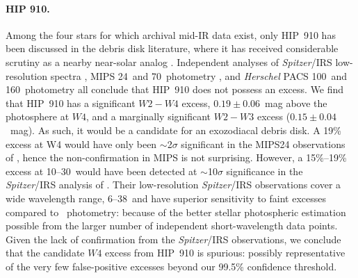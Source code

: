 \paragraph{HIP 910.}
Among the four stars for which archival mid-IR data exist, only HIP~910 has been discussed in the debris disk literature, where it has received considerable scrutiny as a nearby \citep[19~pc;][]{VanLeeuwen2007} near-solar analog \citep[F8V;][]{Gray2006}.  Independent analyses of \textit{ Spitzer}/IRS low-resolution spectra \citep{Beichman2006}, MIPS 24\micron\ and 70\micron\ photometry \citep{Trilling2008}, and \textit{ Herschel} PACS 100\micron\ and 160\micron\ photometry \citep{Eiroa2013} all conclude that HIP~910 does not possess an excess.   We find that HIP~910 has a significant $W2-W4$ excess, $0.19\pm0.06$~mag above the photosphere at $W4$, and a marginally significant $W2-W3$ excess ($0.15\pm0.04$~mag).  As such, it would be a candidate for an exozodiacal debris disk.  A 19\% excess at W4 would have only been $\sim$2$\sigma$ significant in the MIPS24 observations of \citet{Trilling2008}, hence the non-confirmation in MIPS is not surprising.  However, a 15\%--19\% excess at 10--30\micron\ would have been detected at $\sim$10$\sigma$ significance in the \textit{ Spitzer}/IRS analysis of \citet{Beichman2006}.  Their low-resolution \textit{ Spitzer}/IRS observations cover a wide wavelength range, 6--38\micron\, and have superior sensitivity to faint excesses compared to \WS\ photometry: because of the better stellar photospheric estimation possible from the larger number of independent short-wavelength data points.  Given the lack of confirmation from the \textit{ Spitzer}/IRS observations, we conclude that the candidate $W4$ excess from HIP~910 is spurious: possibly representative of the very few false-positive excesses beyond our 99.5\% confidence threshold.


